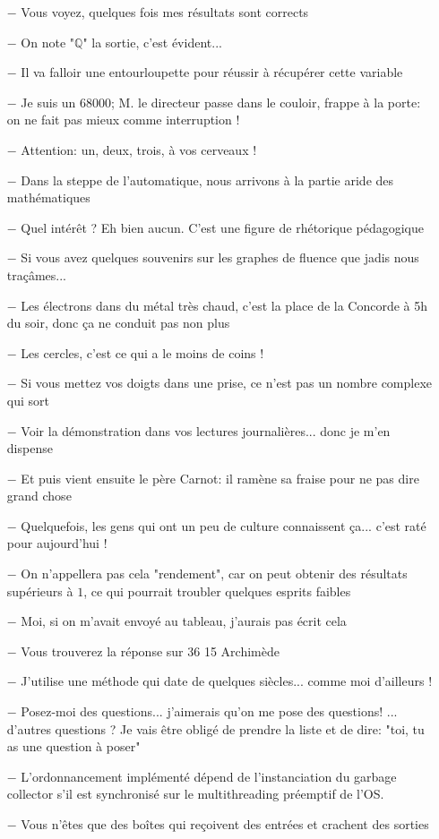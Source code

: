 \begin{itemize}
	\item[$-$] Vous voyez, quelques fois mes résultats sont corrects
	\item[$-$] On note "$\mathbb{Q}$" la sortie, c'est évident...
	\item[$-$] Il va falloir une entourloupette pour réussir à récupérer cette variable
	\item[$-$] Je suis un 68000; M. le directeur passe dans le couloir, frappe à la porte: on ne fait pas mieux comme interruption !
	\item[$-$] Attention: un, deux, trois, à vos cerveaux !
	\item[$-$] Dans la steppe de l'automatique, nous arrivons à la partie aride des mathématiques
	\item[$-$] Quel intérêt ? Eh bien aucun. C'est une figure de rhétorique pédagogique
	\item[$-$] Si vous avez quelques souvenirs sur les graphes de fluence que jadis nous traçâmes...
	\item[$-$] Les électrons dans du métal très chaud, c'est la place de la Concorde à 5h du soir, donc ça ne conduit pas non plus
	\item[$-$] Les cercles, c'est ce qui a le moins de coins !
	\item[$-$] Si vous mettez vos doigts dans une prise, ce n'est pas un nombre complexe qui sort
	\item[$-$] Voir la démonstration dans vos lectures journalières... donc je m'en dispense
	\item[$-$] Et puis vient ensuite le père Carnot: il ramène sa fraise pour ne pas dire grand chose
	\item[$-$] Quelquefois, les gens qui ont un peu de culture connaissent ça... c'est raté pour aujourd'hui !
	\item[$-$] On n'appellera pas cela "rendement", car on peut obtenir des résultats supérieurs à $1$, ce qui pourrait troubler quelques esprits faibles
	\item[$-$] Moi, si on m'avait envoyé au tableau, j'aurais pas écrit cela
	\item[$-$] Vous trouverez la réponse sur 36 15 Archimède
	\item[$-$] J'utilise une méthode qui date de quelques siècles... comme moi d'ailleurs !
	\item[$-$] Posez-moi des questions... j'aimerais qu'on me pose des questions! ... d'autres questions ? Je vais être obligé de prendre la liste et de dire: "toi, tu as une question à poser"
	\item[$-$] L'ordonnancement implémenté dépend de l'instanciation du garbage collector s'il est synchronisé sur le multithreading préemptif de l'OS.
	\item[$-$] Vous n'êtes que des boîtes qui reçoivent des entrées et crachent des sorties
\end{itemize}

